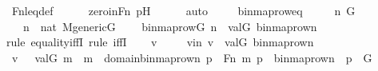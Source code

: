 \begin{isabellebody}
\ Fn{\isacharunderscore}{\kern0pt}leq{\isacharunderscore}{\kern0pt}def\isanewline
\ \ \ \ \isamarkupfalse%
\ zero{\isacharunderscore}{\kern0pt}in{\isacharunderscore}{\kern0pt}Fn\ pH\isanewline
\ \ \ \ \isamarkupfalse%
\ auto\isanewline
{}\isamarkupfalse%
%
\endisatagproof
{\isafoldproof}%
%
\isadelimproof
\isanewline
%
\endisadelimproof
\ \ \ \isanewline
{}\isamarkupfalse%
\ binmap{\isacharunderscore}{\kern0pt}row{\isacharunderscore}{\kern0pt}eq\ {\isacharcolon}{\kern0pt}\ \isanewline
\ \ \ n\ G\ \ \isanewline
\ \ \ {\isachardoublequoteopen}n\ {\isasymin}\ nat{\isachardoublequoteclose}\ {\isachardoublequoteopen}M{\isacharunderscore}{\kern0pt}generic{\isacharparenleft}{\kern0pt}G{\isacharparenright}{\kern0pt}{\isachardoublequoteclose}\ \isanewline
\ \ \ {\isachardoublequoteopen}binmap{\isacharunderscore}{\kern0pt}row{\isacharparenleft}{\kern0pt}G{\isacharcomma}{\kern0pt}\ n{\isacharparenright}{\kern0pt}\ {\isacharequal}{\kern0pt}\ val{\isacharparenleft}{\kern0pt}G{\isacharcomma}{\kern0pt}\ binmap{\isacharunderscore}{\kern0pt}row{\isacharprime}{\kern0pt}{\isacharparenleft}{\kern0pt}n{\isacharparenright}{\kern0pt}{\isacharparenright}{\kern0pt}{\isachardoublequoteclose}\ \isanewline
%
\isadelimproof
%
\endisadelimproof
%
\isatagproof
{}\isamarkupfalse%
{\isacharparenleft}{\kern0pt}rule\ equality{\isacharunderscore}{\kern0pt}iffI{\isacharcomma}{\kern0pt}\ rule\ iffI{\isacharparenright}{\kern0pt}\isanewline
\ \ \isamarkupfalse%
\ v\ \isanewline
\ \ \isamarkupfalse%
\ vin{\isacharcolon}{\kern0pt}\ {\isachardoublequoteopen}v\ {\isasymin}\ val{\isacharparenleft}{\kern0pt}G{\isacharcomma}{\kern0pt}\ binmap{\isacharunderscore}{\kern0pt}row{\isacharprime}{\kern0pt}{\isacharparenleft}{\kern0pt}n{\isacharparenright}{\kern0pt}{\isacharparenright}{\kern0pt}{\isachardoublequoteclose}\ \isanewline
\ \ \isamarkupfalse%
\ {\isachardoublequoteopen}v\ {\isasymin}\ {\isacharbraceleft}{\kern0pt}\ val{\isacharparenleft}{\kern0pt}G{\isacharcomma}{\kern0pt}\ m{\isacharparenright}{\kern0pt}\ {\isachardot}{\kern0pt}{\isachardot}{\kern0pt}\ m\ {\isasymin}\ domain{\isacharparenleft}{\kern0pt}binmap{\isacharunderscore}{\kern0pt}row{\isacharprime}{\kern0pt}{\isacharparenleft}{\kern0pt}n{\isacharparenright}{\kern0pt}{\isacharparenright}{\kern0pt}{\isacharcomma}{\kern0pt}\ {\isasymexists}p\ {\isasymin}\ Fn{\isachardot}{\kern0pt}\ {\isasymlangle}m{\isacharcomma}{\kern0pt}\ p{\isasymrangle}\ {\isasymin}\ binmap{\isacharunderscore}{\kern0pt}row{\isacharprime}{\kern0pt}{\isacharparenleft}{\kern0pt}n{\isacharparenright}{\kern0pt}\ {\isasymand}\ p\ {\isasymin}\ G\ {\isacharbraceright}{\kern0pt}{\isachardoublequoteclose}\isanewline

\end{isabellebody}
